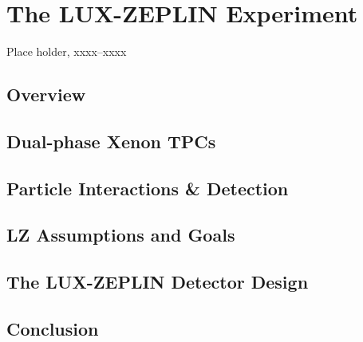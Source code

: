 \chapter{The LUX-ZEPLIN Experiment}
\label{chap:chap2}

%
{Place holder, xxxx--xxxx}%

\section{Overview}



\section{Dual-phase Xenon TPCs}
\label{sec:dualphaseTPC}


\section{Particle Interactions \& Detection}
\label{sec:xenonphysics}

\section{LZ Assumptions and Goals}
\label{sec:lzgoals}

\section{The LUX-ZEPLIN Detector Design}
\label{sec:design}

\section{Conclusion}





